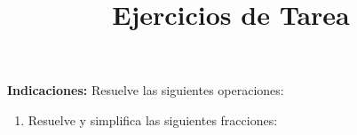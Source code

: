 

\title{Ejercicios de Tarea \vspace{-2cm}}
\author{}
\date{ }



\maketitle
\fontsize{14}{14}\selectfont

\textbf{Indicaciones: } Resuelve las siguientes operaciones:

\begin{enumerate}[label=\roman*)]
\item  Resuelve y simplifica las siguientes fracciones:
\begin{table}[H]
\centering
\def\arraystretch{2}
\setlength{\tabcolsep}{18pt}
\begin{tabular}{ | c | c | c | c | } 

\end{tabular}
\end{table}
\end{enumerate}
